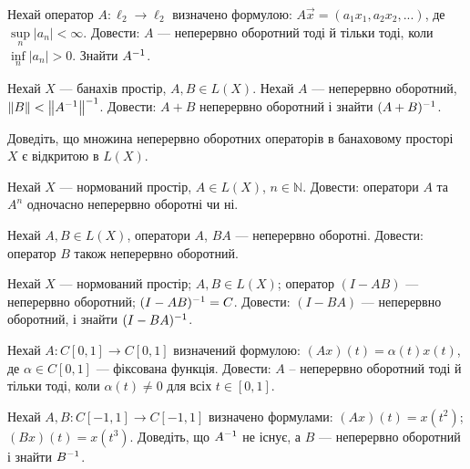 \begin{exercise}
    Нехай оператор $A: \ell_2 \rightarrow \ell_2$ визначено формулою: 
    $A\vec{x} = (a_1x_1, a_2x_2, ...)$, де $\underset{n}{\sup}|a_n| < \infty$. Довести: 
    $A$ --- неперервно оборотний тоді й тільки тоді, коли $\underset{n}{\inf}|a_n| > 0$. 
    Знайти $A^{-1}$.
\end{exercise}

\begin{exercise}
    Нехай $X$ --- банахів простір, $A, B \in L(X)$. Нехай $A$ --- неперервно оборотний, 
    $\left\lVert B\right\rVert < \left\lVert A^{-1}\right\rVert^{-1}$. Довести: $A + B$ неперервно оборотний і знайти 
    $(A+B)^{-1}$.
\end{exercise}

\begin{exercise}
    Доведіть, що множина неперервно оборотних операторів в банаховому просторі $X$ є відкритою 
    в $L(X)$. 
\end{exercise}

\begin{exercise}
    Нехай $X$ --- нормований простір, $A \in L(X)$, $n \in \mathbb{N}$. Довести: оператори 
    $A$ та $A^n$ одночасно неперервно оборотні чи ні.
\end{exercise}

\begin{exercise}
    Нехай $A, B \in L(X)$, оператори $A$, $BA$ --- неперервно оборотні. Довести: оператор 
    $B$ також неперервно оборотний.
\end{exercise}

\begin{exercise}
    Нехай $X$ --- нормований простір; $A, B \in L(X)$; оператор $(I - AB)$ --- неперервно 
    оборотний; $(I - AB)^{-1} = C$. Довести: $(I - BA)$ --- неперервно оборотний, і знайти 
    $(I - BA)^{-1}$.
\end{exercise}

\begin{exercise}
    Нехай $A: C[0, 1] \rightarrow C[0, 1]$ визначений формулою: $(Ax)(t) = \alpha(t)x(t)$, 
    де $\alpha \in C[0, 1]$ --- фіксована функція. Довести: $A$ -- неперервно оборотний 
    тоді й тільки тоді, коли $\alpha(t) \neq 0$ для всіх $t \in [0, 1]$. 
\end{exercise}

\begin{exercise}
    Нехай $A, B : C[-1, 1] \rightarrow C[-1, 1]$ визначено формулами: $(Ax)(t) = 
    x(t^2)$; $(Bx)(t) = x(t^3)$. Доведіть, що $A^{-1}$ не існує, а $B$ --- неперервно 
    оборотний і знайти $B^{-1}$.
\end{exercise}
